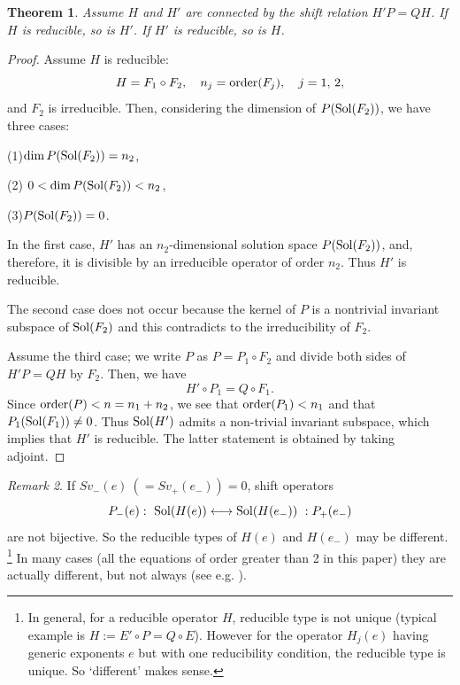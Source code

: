 \documentclass[a4paper,12pt]{article}
\newtheorem{thm}{Theorem}[section]  %
\theoremstyle{definition}
\theoremstyle{remark}
\newtheorem{remark}[thm]{Remark}
\numberwithin{equation}{section} %
\begin{document}
\begin{thm}\label{red_atoap}
  Assume $H$ and $H'$ are connected by the shift relation $H'P=QH$.
  If $H$ is reducible, so is $H'$. If $H'$ is reducible, so is $H$.
\end{thm}
\begin{proof}Assume $H$ is reducible:
  \[H=F_1\circ F_2,\quad n_j={\rm order}(F_j),\quad j=1,\, 2,\]
and $F_2$ is irreducible. Then, considering 
the dimension of $P({\rm Sol}(F_2))$, we have three cases:

\smallskip
(1)\quad $\dim P({\rm Sol}(F_2))=n_2$,

\smallskip
(2) \quad $0<\dim P({\rm Sol}(F_2))<n_2$,

\smallskip
(3)\quad $P({\rm Sol}(F_2))=0$.
\smallskip

In the first case, 
$H'$ has an $n_2$-dimensional solution space $P({\rm Sol}(F_2))$, and, therefore, it is divisible by an irreducible operator of order $n_2$. Thus $H'$ is reducible.

The second case does not occur because
the kernel of $P$ is a nontrivial invariant subspace of ${\rm Sol}(F_2)$ and this contradicts to the irreducibility of $F_2$.

Assume the third case; we write $P$ as $P=P_1\circ F_2$
and divide both sides of $H'P=QH$ by $F_2$. Then, we have
  \[H'\circ P_1=Q\circ F_1.\]
Since ${\rm order} (P)<n=n_1+n_2$, we see that
${\rm order} (P_1) < n_1$ and that $P_1({\rm Sol}(F_1))\not=0$.
Thus ${\rm Sol}(H')$ admits a non-trivial invariant subspace,
which implies that $H'$ is reducible.
The latter statement is obtained by taking adjoint. \end{proof}
\begin{remark}
If $Sv_-(e)\ (=Sv_+(e_-))=0$, shift operators
$$P_-(e):\ {\rm Sol}(H(e))\longleftrightarrow{\rm Sol}(H(e_-))\ :P_+(e_-)$$
are not bijective. So the reducible types of $H(e)$ and $H(e_-)$ may be different. \footnote{In general, for a reducible operator $H$,  reducible type is not unique (typical example is $H:=E'\circ P=Q\circ E$). 
However for the operator $H_j(e)$ having generic exponents $e$ but with one reducibility condition, the reducible type is unique. So `different' makes sense.}
In many cases (all the equations of order greater than 2 in this paper) they are actually different, but not always (see e.g. \cite{EOY}).
\end{remark} 
\end{document}
